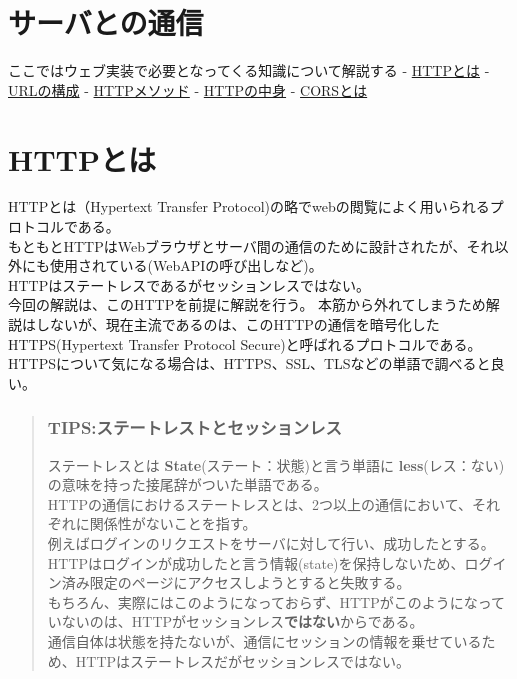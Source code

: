 \section{サーバとの通信}\label{ux30b5ux30fcux30d0ux3068ux306eux901aux4fe1}

ここではウェブ実装で必要となってくる知識について解説する -
\hyperref[httpux3068ux306f]{HTTPとは} -
\hyperref[urlux306eux69cbux6210]{URLの構成} -
\hyperref[httpux30e1ux30bdux30c3ux30c9]{HTTPメソッド} -
\hyperref[httpux306eux4e2dux8eab]{HTTPの中身} -
\hyperref[corsux3068ux306f]{CORSとは}

\section{HTTPとは}\label{httpux3068ux306f}

HTTPとは（Hypertext Transfer
Protocol)の略でwebの閲覧によく用いられるプロトコルである。\\
もともとHTTPはWebブラウザとサーバ間の通信のために設計されたが、それ以外にも使用されている(WebAPIの呼び出しなど)。\\
HTTPはステートレスであるがセッションレスではない。\\
今回の解説は、このHTTPを前提に解説を行う。
本筋から外れてしまうため解説はしないが、現在主流であるのは、このHTTPの通信を暗号化したHTTPS(Hypertext
Transfer Protocol Secure)と呼ばれるプロトコルである。\\
HTTPSについて気になる場合は、HTTPS、SSL、TLSなどの単語で調べると良い。

\begin{quote}
\subsubsection{TIPS:ステートレストとセッションレス}\label{tipsux30b9ux30c6ux30fcux30c8ux30ecux30b9ux30c8ux3068ux30bbux30c3ux30b7ux30e7ux30f3ux30ecux30b9}

ステートレスとは \textbf{State}(ステート：状態)と言う単語に
\textbf{less}(レス：ない)の意味を持った接尾辞がついた単語である。\\
HTTPの通信におけるステートレスとは、2つ以上の通信において、それぞれに関係性がないことを指す。\\
例えばログインのリクエストをサーバに対して行い、成功したとする。\\
HTTPはログインが成功したと言う情報(state)を保持しないため、ログイン済み限定のページにアクセスしようとすると失敗する。\\
もちろん、実際にはこのようになっておらず、HTTPがこのようになっていないのは、HTTPがセッションレス\textbf{ではない}からである。\\
通信自体は状態を持たないが、通信にセッションの情報を乗せているため、HTTPはステートレスだがセッションレスではない。
\end{quote}

